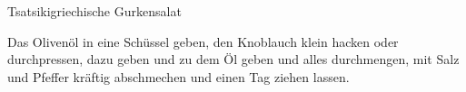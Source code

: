 \begin{recipe}{Tsatsiki}{griechische Gurkensalat}
  \inglist
  
  \steps
  Das Olivenöl in eine Schüssel geben, den Knoblauch klein hacken oder durchpressen, 
  dazu geben und zu dem Öl geben und alles durchmengen, mit Salz und Pfeffer kräftig 
  abschmechen und einen Tag ziehen lassen.
\end{recipe}
